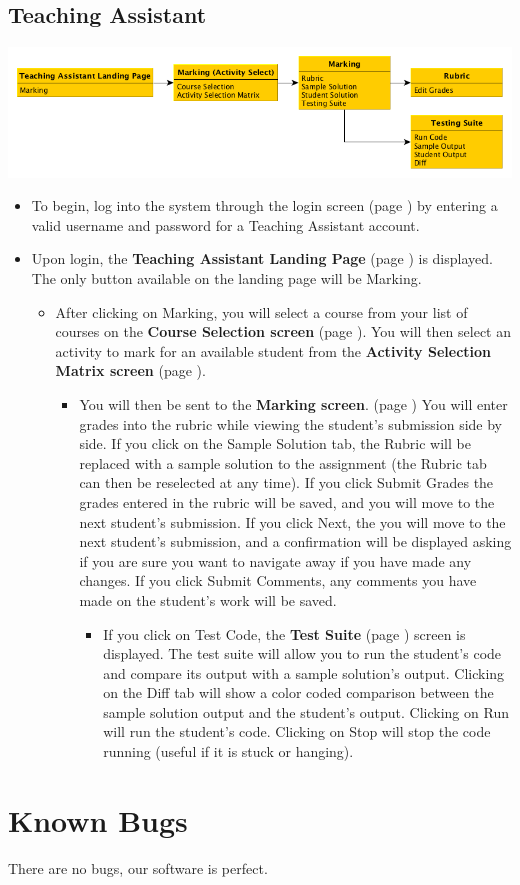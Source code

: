 \documentclass{article}
\begin{document}
\subsection{Teaching Assistant}
\centerline{\includegraphics[scale=.6]{../images/UIMockups/pngs/teachingAsst}}
\begin{itemize}
  \item To begin, log into the system through the login screen (page \pageref{login})
    by entering a valid username and password for a Teaching Assistant account.
  \item Upon login, the \textbf{Teaching Assistant Landing Page} (page \pageref{landPg}) 
  	is displayed. The only button available on the landing page will be Marking.
    \begin{itemize}
      \item After clicking on Marking, you will select a course from your list of courses
	on the \textbf{Course Selection screen} (page \pageref{courseSel}). You will then select an activity
	to mark for an available student from the \textbf{Activity Selection Matrix
	  screen} (page \pageref{actSel}).
	\begin{itemize}
	  \item You will then be sent to the \textbf{Marking screen}. (page
	    \pageref{marking}) You will enter grades into the rubric while viewing 
	    the student's submission side by side. If you click on the Sample Solution 
	    tab, the Rubric will be replaced with a sample solution to the assignment 
	    (the Rubric tab can then be reselected at any time). If you click Submit 
	    Grades the grades entered in the rubric will be saved, and you will 
	    move to the next student's submission. If you click Next, the you will 
	    move to the next student's submission, and a confirmation will be displayed 
	    asking if you are sure you want to navigate away if you have made any 
	    changes. If you click Submit Comments, any comments you have made 
	    on the student's work will be saved.
	    \begin{itemize}
	      \item If you click on Test Code, the \textbf{Test Suite} (page 
		\pageref{testSuite}) screen is displayed. The test suite will allow you 
		to run the student's code and compare its output with a sample 
		solution's output. Clicking on the Diff tab will show a color coded 
		comparison between the sample solution output and the student's 
		output. Clicking on Run will run the student's code. Clicking on Stop 
		will stop the code running (useful if it is stuck or hanging).
	    \end{itemize}
	\end{itemize}
    \end{itemize}
\end{itemize}

\section{Known Bugs}
There are no bugs, our software is perfect.
\end{document}
